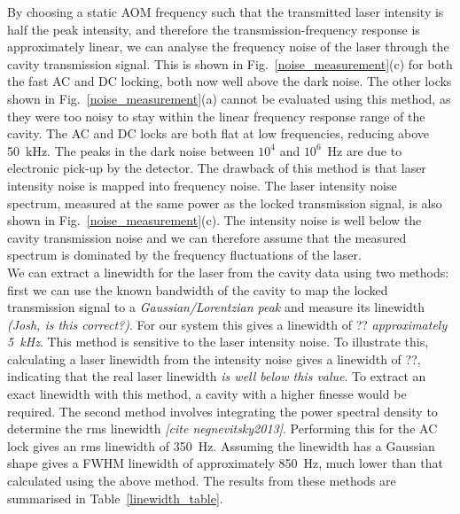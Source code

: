 \documentclass[10pt,letterpaper]{article}
\begin{document}
By choosing a static AOM frequency such that the transmitted laser intensity is half the peak intensity, and therefore the transmission-frequency response is approximately linear, we can analyse the frequency noise of the laser through the cavity transmission signal. This is shown in Fig.~\ref{noise_measurement}(c) for both the fast AC and DC locking, both now well above the dark noise. The other locks shown in Fig.~\ref{noise_measurement}(a) cannot be evaluated using this method, as they were too noisy to stay within the linear frequency response range of the cavity. The AC and DC locks are both flat at low frequencies, reducing above 50~kHz. The peaks in the dark noise between $10^4$ and $10^6$~Hz are due to electronic pick-up by the detector. The drawback of this method is that laser intensity noise is mapped into frequency noise. The laser intensity noise spectrum, measured at the same power as the locked transmission signal, is also shown in Fig.~\ref{noise_measurement}(c). The intensity noise is well below the cavity transmission noise and we can therefore assume that the measured spectrum is dominated by the frequency fluctuations of the laser.\\

We can extract a linewidth for the laser from the cavity data using two methods: first we can use the known bandwidth of the cavity to map the locked transmission signal to a \textit{Gaussian/Lorentzian peak} and measure its linewidth \textit{(Josh, is this correct?)}. For our system this gives a linewidth of ?? \textit{approximately 5~kHz}. This method is sensitive to the laser intensity noise. To illustrate this, calculating a laser linewidth from the intensity noise gives a linewidth of ??, indicating that the real laser linewidth \textit{is well below this value}. To extract an exact linewidth with this method, a cavity with a higher finesse would be required. The second method involves integrating the power spectral density to determine the rms linewidth \textit{[cite negnevitsky2013]}. Performing this for the AC lock gives an rms linewidth of 350~Hz. Assuming the linewidth has a Gaussian shape gives a FWHM linewidth of approximately 850~Hz, much lower than that calculated using the above method. The results from these methods are summarised in Table~\ref{linewidth_table}.\\
\end{document}
